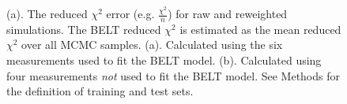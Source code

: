 \documentclass[journal=jacsat,manuscript=article]{achemso}
\begin{document}
\begin{figure}
\caption{
(a).  The reduced $\chi^2$ error (e.g. $\frac{\chi^2}{n}$) for raw and reweighted simulations.  The BELT reduced $\chi^2$ is estimated as the mean reduced $\chi^2$ over all MCMC samples.  (a).  Calculated using the six measurements used to fit the BELT model.  (b).  Calculated using four measurements \emph{not} used to fit the BELT model.  See Methods for the definition of training and test sets.
}
\label{figure:ChiSquared}
\end{figure}
\end{document}
